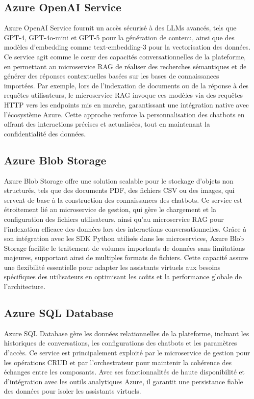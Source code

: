 \subsection{Azure OpenAI Service}
Azure OpenAI Service \cite{azure-openai-docs} fournit un accès sécurisé à des LLMs avancés, tels que GPT-4, GPT-4o-mini et GPT-5 pour la génération de contenu, ainsi que des modèles d'embedding comme text-embedding-3 pour la vectorisation des données. Ce service agit comme le cœur des capacités conversationnelles de la plateforme, en permettant au microservice RAG de réaliser des recherches sémantiques et de générer des réponses contextuelles basées sur les bases de connaissances importées. Par exemple, lors de l'indexation de documents ou de la réponse à des requêtes utilisateurs, le microservice RAG invoque ces modèles via des requêtes HTTP vers les endpoints mis en marche, garantissant une intégration native avec l'écosystème Azure. Cette approche renforce la personnalisation des chatbots en offrant des interactions précises et actualisées, tout en maintenant la confidentialité des données.

\subsection{Azure Blob Storage}
Azure Blob Storage \cite{azure-blob-docs} offre une solution scalable pour le stockage d'objets non structurés, tels que des documents PDF, des fichiers CSV ou des images, qui servent de base à la construction des connaissances des chatbots. Ce service est étroitement lié au microservice de gestion, qui gère le chargement et la configuration des fichiers utilisateurs, ainsi qu'au microservice RAG pour l'indexation efficace des données lors des interactions conversationnelles. Grâce à son intégration avec les SDK Python utilisés dans les microservices, Azure Blob Storage facilite le traitement de volumes importants de données sans limitations majeures, supportant ainsi de multiples formats de fichiers. Cette capacité assure une flexibilité essentielle pour adapter les assistants virtuels aux besoins spécifiques des utilisateurs en optimisant les coûts et la performance globale de l'architecture.
\subsection{Azure SQL Database}
Azure SQL Database \cite{azure-sql-docs} gère les données relationnelles de la plateforme, incluant les historiques de conversations, les configurations des chatbots et les paramètres d'accès. Ce service est principalement exploité par le microservice de gestion pour les opérations CRUD et par l'orchestrateur pour maintenir la cohérence des échanges entre les composants. Avec ses fonctionnalités de haute disponibilité et d'intégration avec les outils analytiques Azure, il garantit une persistance fiable des données pour isoler les assistants virtuels.
